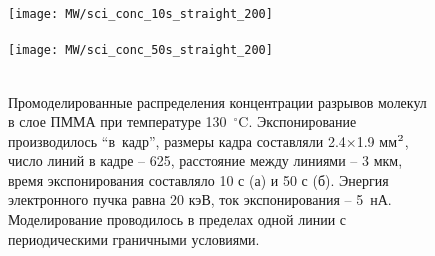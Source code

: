 \begin{figure}[t]
	\begin{center}
		\texttt{[image: MW/sci\_conc\_10s\_straight\_200]} \\
		\vspace{-3.7em}  \vspace{2.7em} \\
		\texttt{[image: MW/sci\_conc\_50s\_straight\_200]} \\
		\vspace{-3.7em}  \vspace{3.7em} \\
	\end{center}
	\vspace{-2.5em}
	\caption{
		Промоделированные распределения концентрации разрывов молекул в слое ПММА при температуре 130~$^\circ$C.
		Экспонирование производилось ``в~кадр'', размеры кадра составляли 2.4$\times$1.9 мм$^\text{2}$, число линий в кадре -- 625, расстояние между линиями -- 3 мкм, время экспонирования составляло 10 с (а) и 50 с (б).
		Энергия электронного пучка равна 20 кэВ, ток экспонирования -- 5~нА. Моделирование проводилось в пределах одной линии с периодическими граничными условиями.}
	\label{fig:scission_hist}
\end{figure}

